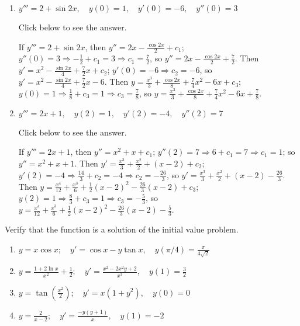 \documentclass{ximera}
\begin{document}
\begin{problem}
\begin{enumerate}
\item %
$y'''=2+\sin 2x, \quad y(0)=1, \quad y'(0)=-6, \quad
y''(0)=3$

Click below to see the answer.

\begin{expandable}
    If $y'''=2+\sin2x$, then $y''=2x-\frac{\cos 2x}{2}+c_1$;
$y''(0)=3\Rightarrow -\frac{1}{2}+c_1=3\Rightarrow c_1=\frac{7}{2}$, so $y''=2x-\frac{\cos 2x}{2}+\frac{7}{2}$. Then
$y'=x^2-\frac{\sin 2x}{4}+\frac{7}{2}x+c_2$; $y'(0)=-6\Rightarrow
c_2=-6$, so $y'=x^2-\frac{\sin 2x}{4}+\frac{7}{2}x-6$. Then
$y=\frac{x^3}{3}+\frac{\cos 2x}{8}+\frac{7}{4}x^2-6x+c_3$;
$y(0)=1\Rightarrow \frac{1}{8}+c_3=1\Rightarrow c_3=\frac{7}{8}$, so $y=\frac{x^3}{3}+\frac{\cos 2x}{8}+
\frac{7}{4}x^2-6x+\frac{7}{8}$.
\end{expandable}

\item %
$y'''=2x+1, \quad y(2)=1, \quad
y'(2)=-4, \quad y''(2)=7$

Click below to see the answer.

\begin{expandable}
    If $y'''=2x+1$, then $y''=x^2+x+c_1$; $y''(2)=7\Rightarrow
6+c_1=7\Rightarrow c_1=1$; so $y''=x^2+x+1$. Then $y'=\frac{x^3}{3}+\frac{x^2}{2}+(x-2)+c_2$; $y'(2)=-4\Rightarrow \frac{14}{3}+c_2=-4\Rightarrow c_2=-\frac{26}{3}$, so $y'=\frac{x^3}{3}+\frac{x^2}{2}+(x-2)-\frac{26}{3}$. Then $y=\frac{x^4}{12}+\frac{x^3}{6}+\frac{1}{2}(x-2)^2-\frac{26}{3}(x-2)+c_3$;
$y(2)=1\Rightarrow \frac{8}{3}+c_3=1\Rightarrow c_3=-\frac{5}{3}$, so $y=\frac{x^4}{12}+\frac{x^3}{6}+\frac{1}{2} (x-2)^2-\frac{26}{3}
(x-2)-\frac{5}{3}$.
\end{expandable}
\end{enumerate}
\end{problem}

\begin{problem}\label{exer:1.2.5}
Verify that the  function is a solution of
the initial value problem.

\begin{enumerate}
\item %
$y=x\cos x;     \quad y'=\cos x-y\tan x, \quad
y(\pi/4)=\frac{\pi}{4\sqrt{2}}$

\item %
$y=\frac{1+2\ln x}{ x^2}+\frac{1}{2};     \quad
y'=\frac{x^2-2x^2y+2}{ x^3},   \quad y(1)=\frac{3}{2}$

\item %
$y=\tan\left(\frac{x^2}{2}\right);
\quad y'=x(1+y^2),   \quad y(0)=0$

\item %
$y=\frac{2}{ x-2};     \quad y'=\frac{-y(y+1)}{ x}, \quad
y(1)=-2$
\end{enumerate}
\end{problem}
\end{document}
